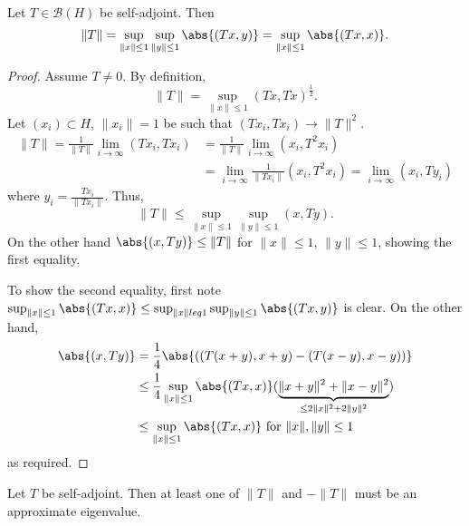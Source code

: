\documentclass{article}
\begin{document}
\begin{lemma}
    Let $T \in \mathcal{B}(H)$ be self-adjoint. Then
    \begin{equation*}
        \|T\| = \sup_{\|x\| \leq 1} \sup_{\|y\| \leq 1} \abs{(Tx, y)} = \sup_{\|x\| \leq 1} \abs{(Tx, x)}.
    \end{equation*}
\end{lemma}

\begin{proof}
    Assume $T \neq 0$. By definition,
    \begin{equation*}
        \|T\| = \sup_{\|x\| \leq 1} (Tx,Tx)^\frac{1}{2}.
    \end{equation*}
    Let $(x_i) \subset H$, $\|x_i\| = 1$ be such that $(T x_i, T x_i) \to \|T\|^2$.
    \begin{align*}
        \|T\| = \frac{1}{\|T\|} \lim_{i \to \infty} (T x_i, T x_i) &= \frac{1}{\|T\|} \lim_{i \to \infty} (x_i, T^2 x_i) \\
                                                                         &= \lim_{i \to \infty} \frac{1}{\|T x_i\|} (x_i, T^2 x_i) = \lim_{i \to \infty} (x_i, T y_i)
    \end{align*}
    where $y_i = \frac{T x_i}{\|T x_i\|}$. Thus,
    \begin{equation*}
        \|T\| \leq \sup_{\|x\| \leq 1} \sup_{\|y\| \leq 1} (x, Ty).
    \end{equation*}
    On the other hand $\abs{(x, Ty)} \leq \|T\|$ for $\|x\| \leq 1$, $\|y\| \leq 1$, showing the first equality.

    To show the second equality, first note $\sup_{\|x\| \leq 1} \abs{(Tx,x)} \leq \sup_{\|x\| leq 1} \sup_{\|y\| \leq 1} \abs{(Tx, y)}$ is clear. On the other hand,
    \begin{align*}
        \abs{(x, Ty)} &= \frac{1}{4} \abs{((T(x+y),x+y) - (T(x-y),x-y))} \\
        &\leq \frac{1}{4} \sup_{\|x\| \leq 1} \abs{(Tx,x)} (\underbrace{\|x+y\|^2 + \|x-y\|^2}_{\leq 2 \|x\|^2 + 2 \|y\|^2}) \\
        &\leq \sup_{\|x\| \leq 1} \abs{(Tx,x)} \text{ for }\|x\|, \|y\| \leq 1
    \end{align*}
    as required.
\end{proof}

\begin{lemma}
    Let $T$ be self-adjoint. Then at least one of $\|T\|$ and $-\|T\|$ must be an approximate eigenvalue.
\end{lemma}
\end{document}
